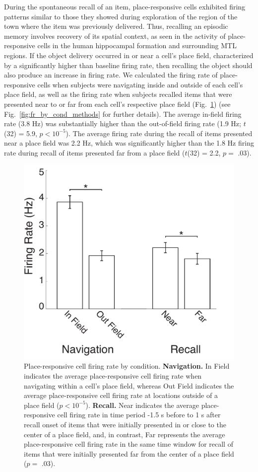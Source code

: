 During the spontaneous recall of an item, place-responsive cells exhibited firing patterns similar to those they showed during exploration of the region of the town where the item was previously delivered.  Thus, recalling an episodic memory involves recovery of its spatial context, as seen in the activity of place-responsive cells in the human hippocampal formation and surrounding MTL regions. If the object delivery occurred in or near a cell's place field, characterized by a significantly higher than baseline firing rate, then recalling the object should also produce an increase in firing rate. We calculated the firing rate of place-responsive cells when subjects were navigating inside and outside of each cell's place field, as well as the firing rate when subjects recalled items that were presented near to or far from each cell's respective place field (Fig.~\ref{fig:fr_by_cond}) (see Fig.~\ref{fig:fr_by_cond_methods} for further details).  The average in-field firing rate (3.8 Hz) was substantially higher than the out-of-field firing rate  (1.9 Hz; $t$(32) = 5.9, $p < 10^{-5}$).  The average firing rate during the recall of items presented near a place field was 2.2 Hz, which was significantly higher than the 1.8 Hz firing rate during recall of items presented far from a place field ($t$(32) = 2.2, $p =$ .03).

\begin{figure}[t]
\centering
  \includegraphics[width=.6\textwidth]{./tex/dboy/figs/fig4}
  \caption[Place-responsive cell firing rate by condition]{Place-responsive cell firing rate by condition. \textbf{Navigation.} In Field indicates the average place-responsive cell firing rate when navigating within a cell's place field, whereas Out Field indicates the average place-responsive cell firing rate at locations outside of a place field ($p < 10^{-5}$). \textbf{Recall.} Near indicates the average place-responsive cell firing rate in time period -1.5 s before to 1 s after recall onset of items that were initially presented in or close to the center of a place field, and, in contrast, Far represents the average place-responsive cell firing rate in the same time window for recall of items that were initially presented far from the center of a place field ($p =$ .03).}
\label{fig:fr_by_cond}
\end{figure}

